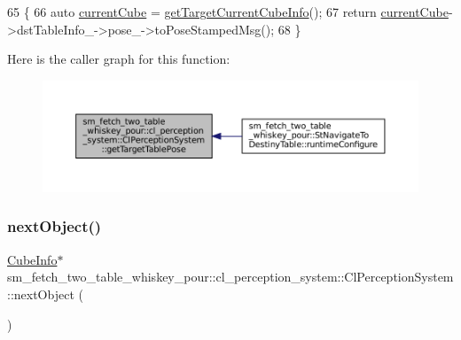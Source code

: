 \begin{DoxyCode}
65             \{
66                 \textcolor{keyword}{auto} \hyperlink{classsm__fetch__two__table__whiskey__pour_1_1cl__perception__system_1_1ClPerceptionSystem_ae587d77404f6518bb1f6cf8e835aa3e9}{currentCube} = \hyperlink{classsm__fetch__two__table__whiskey__pour_1_1cl__perception__system_1_1ClPerceptionSystem_a09899882cdea9c265e98881bb903882b}{getTargetCurrentCubeInfo}();
67                 \textcolor{keywordflow}{return} \hyperlink{classsm__fetch__two__table__whiskey__pour_1_1cl__perception__system_1_1ClPerceptionSystem_ae587d77404f6518bb1f6cf8e835aa3e9}{currentCube}->dstTableInfo\_->pose\_->toPoseStampedMsg();
68             \}
\end{DoxyCode}
Here is the caller graph for this function\+:
\nopagebreak
\begin{figure}[H]
\begin{center}
\leavevmode
\includegraphics[width=350pt]{classsm__fetch__two__table__whiskey__pour_1_1cl__perception__system_1_1ClPerceptionSystem_a2deba9a5465a6223d40c0f1028c31fe6_icgraph}
\end{center}
\end{figure}
\mbox{\label{classsm__fetch__two__table__whiskey__pour_1_1cl__perception__system_1_1ClPerceptionSystem_af64db2ac7aafc3369f84c02b2a360b28}} 
\subsubsection{\texorpdfstring{next\+Object()}{nextObject()}}
{\footnotesize\ttfamily \hyperlink{structsm__fetch__two__table__whiskey__pour_1_1cl__perception__system_1_1CubeInfo}{Cube\+Info}$\ast$ sm\+\_\+fetch\+\_\+two\+\_\+table\+\_\+whiskey\+\_\+pour\+::cl\+\_\+perception\+\_\+system\+::\+Cl\+Perception\+System\+::next\+Object (\begin{DoxyParamCaption}{ }\end{DoxyParamCaption})\hspace{0.3cm}{\ttfamily [inline]}}



